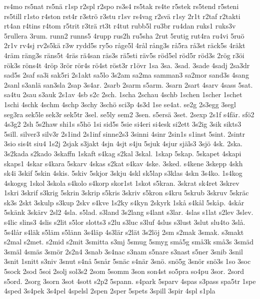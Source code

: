 {rs4mo
rs5nat
rs5n^^e4
r1sp
r2spl
r2spo
rs3s4
rs5tak
rs4te
r5stek
rs5tend
r5steni
rs5till
r1sto
r4ston
rst4r
r3str^^f6
r3stu
r1sv
rs4vag
r2sv^^e4
r1sy
2r1t
r2taf
r2takti
rt4an
r4tins
r4tom
r5trit
r3tr^^e4
rt3t
r4tut
rubb5l
ru3br
ru4dan
ruks1
ruks3v
5rullera
3rum.
runn2
runns5
4rupp
rus2h
ru5sha
2rut
5rutig
rut4ra
ru4vi
5ru^^f6
2r1v
rv4sj
rv2s5k^^e4
r3w
rydd5s
ry5o
r^^e5ge5l
4r^^e5l
r^^e5ng3s
r^^e55ra
r^^e53st
r^^e4ck5s
4r^^e4kt
4r^^e4m
r^^e4ng3s
r^^e4ns5t
4r^^e4s
r^^e44san
r^^e4s3s
r^^e45sti
r^^e4v5s
r^^f6d5el
r^^f6d5r
r^^f6d3s
2r^^f6g
r3^^f6i
r^^f6k3s
r^^f6ns4t
4r^^f6p
3r^^f6r
r^^f6r4s
r^^f64st
r^^f6st3r
r1^^f6vr
1sa
3sa.
3sad.
3sade
4sadj
2sa3dr
sad5s
2saf
sa3i
sak5ri
2s1akt
sa5lo
3s2am
sa2ma
samman3
sa2mor
sand3s
4sang
2sanl
s3anl^^e4
san3sla
2sap
3s4ar.
2sarb
2sarm
s5arm.
3sarn
2sart
4sarv
4sass
5sat.
sa4tu
2sau
s3auk
2s1av
4sb
s2c
2sch.
1scha
2schau
4schb
1schen
1scher
1schet
1schi
4schk
4schm
4schp
3schy
3sch^^f6
sci3p
4s3d
1se
se4at.
se2g
2s3egg
3segl
seg3ra
sek5le
sek3r
sek5tr
3sel.
se5ly
sem2
3sen.
s5ers^^e4
3set.
2sexp
2s1f
s4f^^e4r.
sf^^f62
4s3g2
2sh
5s2haw
shi1s
s5h^^f6
1si
sid5s
5sie
si4eri
si4esk
si2ett
3s2ig
3sik
sikts3
5sill.
silver3
silv3r
2s1ind
2s1inf
sinne2s3
3sinni
4sinr
2sin1s
s1inst
5sint.
2sintr
3sio
sis4t
siu4
1s2j
2sjak
s3jakt
4sjn
4sjt
s4ju
5sjuk
4sjur
sj^^e4ls3
3sj^^f6
4sk.
2ska.
3s2kada
s2kado
3skaffn
1skaft
s4kag
s2kal
3skal.
1skap
5skap.
5skapet
4skapi
skaps1
4skar
s4kara
5skarv
4skas
s2kat
s4kav
4ske.
3sked.
s4kene
3skepp
4skh
sk4i
3skif
5skin
4skis.
5skiv
5skjor
3skju
4skl
sk5lap
s3klas
4skn
3s4ko.
1s4kog
4skogsg
1skol
3skola
s4kolo
s4korp
skor1st
1skot
s5kran.
3skrat
sk4ret
3skrev
1skri
3skrif
s3krig
5skrin
3skrip
s5kris
3skriv
s5kron
s4kru
5skrub
3skruv
5skr^^e4c
sk3s
2skt
3skulp
s3kup
2skv
s4kve
1s2ky
s4kyn
2skyrk
1sk^^e5
s4k^^e5l
5sk^^e5p.
4sk^^e5r
5sk^^e4nk
3sk^^e4rv
2sl2
4sla.
s5lad.
s3land
3s2lang
s4lant
s3lar.
4slas
s1lat
s2lev
3slev.
s4lic
slins3
4slis
s2lit
s5lor
slotts3
s2lu
s3luc
s3luf
4slus
s3lust
3slut
slu4to
3sl^^e5.
5s4l^^e5r
s4l^^e4k
s5l^^e4m
s5l^^e4nn
3s4l^^e4p
4s3l^^e4r
s2l^^e4t
3s2l^^f6j
2sm
s2mak
3smak.
s3makt
s2mal
s2met.
s2mid
s2mit
3smitta
s3mj
5smug
5smyg
sm^^e55g
sm^^e53k
sm^^e53s
3sm^^e4d
3sm^^e4l
4sm^^e4s
3sm^^f6r
2s2n4
3snab
3s4nac
s3nam
s5nare
s3nast
s5ner
3snib
3snil
3snit
1snitt
s3niv
3snut
s4n^^e5
5sn^^e5r
5sn^^e4c
s4n^^e4r
3sn^^f6.
sn^^f65g
3sn^^f6r
sn^^f63s
1so
3soc
5sock
2sod
5soi
2solj
sol3s2
2som
5somm
3son
son4st
so5pra
so4pu
3sor.
2sord
s5ord.
2sorg
3sorn
3sot
4sott
s2p2
5spann.
s4park
5sparv
4spas
s3pass
spa5tr
1spe
4sped
3s4pek
3s4pel
4spelsl
2spen
2sper
5spets
3spill
3spir
4spl
s1pla
}
